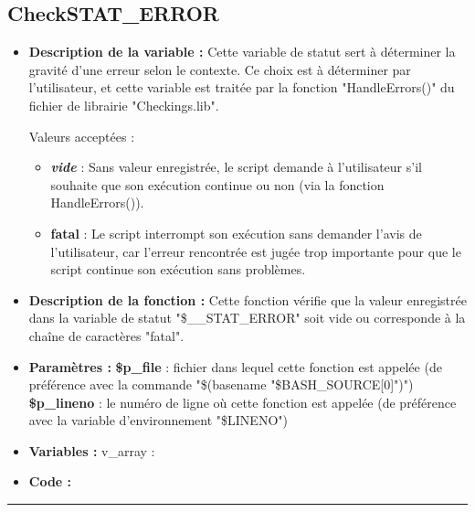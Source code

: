 \documentclass[a4paper,10pt]{article}
\begin{document}
\color{green}
\subsection{CheckSTAT\_ERROR}\color{white}
\begin{itemize}
    \item \textbf{Description de la variable :} Cette variable de statut sert à déterminer la gravité d'une erreur selon le contexte. Ce choix est à déterminer par l'utilisateur, et cette variable est traitée par la fonction "HandleErrors()" du fichier de librairie "Checkings.lib".
    
    Valeurs acceptées :
    \begin{itemize}
        \item \textbf{\textit{vide}} : Sans valeur enregistrée, le script demande à l'utilisateur s'il souhaite que son exécution continue ou non (via la fonction HandleErrors()).
        \item \textbf{fatal} : Le script interrompt son exécution sans demander l'avis de l'utilisateur, car l'erreur rencontrée est jugée trop importante pour que le script continue son exécution sans problèmes.
    \end{itemize}

    \item \textbf{Description de la fonction :} Cette fonction vérifie que la valeur enregistrée dans la variable de statut "\$\_\_STAT\_ERROR" soit vide ou corresponde à la chaîne de caractères "fatal".

    \item \textbf{Paramètres :}
    \color{orange}\textbf{\$p\_file}\color{white} : fichier dans lequel cette fonction est appelée (de préférence avec la commande "\$(\color{gray}basename \color{white}"\color{orange}\$BASH\_SOURCE[0]\color{white}")")
    \color{orange}\textbf{\$p\_lineno}\color{white} : le numéro de ligne où cette fonction est appelée (de préférence avec la variable d'environnement "\color{orange}\$LINENO\color{white}")

    \item \textbf{Variables :} v\_array :

    \item \textbf{Code :}
\end{itemize}



\color{green}\par\noindent\rule{\textwidth}{0.4pt}\color{white}

\color{green}
\end{document}
